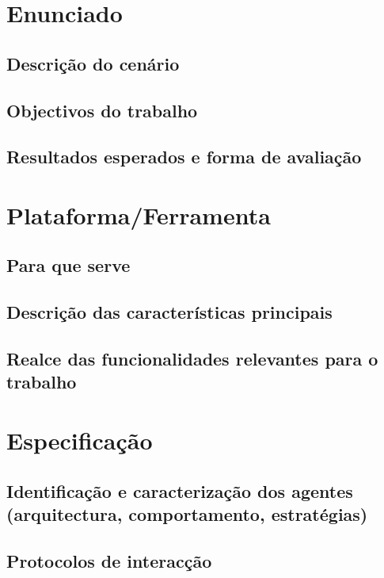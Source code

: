 \documentclass[a4paper, 12pt, twoside]{scrreprt}
\begin{document}
\setcounter{page}{2}
\newpage

\tableofcontents

\clearpage
\chapter{Enunciado}
\setcounter{page}{3}
\section{Descrição do cenário}
\section{Objectivos do trabalho}
\section{Resultados esperados e forma de avaliação}
 
\chapter{Plataforma/Ferramenta}
\section{Para que serve}
\section{Descrição das características principais}
\section{Realce das funcionalidades relevantes para o trabalho}

\chapter{Especificação}
\section{Identificação e caracterização dos agentes (arquitectura, comportamento, estratégias)}
\section{Protocolos de interacção}
\end{document}
